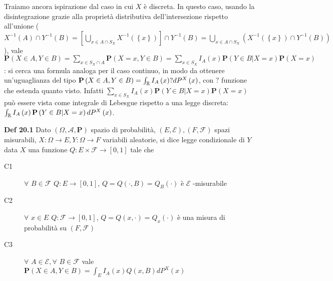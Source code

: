 \documentclass{article}
\begin{document}
Traiamo ancora ispirazione dal caso in cui $X$ \`{e} discreta. In questo
caso, usando la disintegrazione grazie alla propriet\`{a} distributiva
dell'intersezione rispetto all'unione ($X^{-1}\left( A\right) \cap
Y^{-1}\left( B\right) =\left[ \bigcup_{x\in A\cap S_{X}}X^{-1}\left( \left\{
x\right\} \right) \right] \cap Y^{-1}\left( B\right) =\bigcup_{x\in A\cap
S_{X}}\left( X^{-1}\left( \left\{ x\right\} \right) \cap Y^{-1}\left(
B\right) \right) $), vale $\mathbf{P}\left( X\in A,Y\in B\right) =\sum_{x\in
S_{X}\cap A}\mathbf{P}\left( X=x,Y\in B\right) =\sum_{x\in S_{X}}I_{A}\left(
x\right) \mathbf{P}\left( Y\in B|X=x\right) \mathbf{P}\left( X=x\right) $:
si cerca una formula analoga per il caso continuo, in modo da ottenere
un'uguaglianza del tipo $\mathbf{P}\left( X\in A,Y\in B\right) =\int_{%
\mathbb{R}
}I_{A}\left( x\right) ?dP^{X}\left( x\right) $, con $?$ funzione che estenda
quanto visto. Infatti $\sum_{x\in S_{X}}I_{A}\left( x\right) \mathbf{P}%
\left( Y\in B|X=x\right) \mathbf{P}\left( X=x\right) $ pu\`{o} essere vista
come integrale di Lebesgue rispetto a una legge discreta: $\int_{%
\mathbb{R}
}I_{A}\left( x\right) \mathbf{P}\left( Y\in B|X=x\right) dP^{X}\left(
x\right) $.

\textbf{Def 20.1} Dato $\left( \Omega ,\mathcal{A},\mathbf{P}\right) $
spazio di probabilit\`{a}, $\left( E,\mathcal{E}\right) ,\left( F,\mathcal{F}%
\right) $ spazi misurabili, $X:\Omega \rightarrow E,Y:\Omega \rightarrow F$
variabili aleatorie, si dice legge condizionale di $Y$ data $X$ una funzione 
$Q:E\times \mathcal{F}\rightarrow \left[ 0,1\right] $ tale che

\begin{description}
\item[C1] $\forall $ $B\in \mathcal{F}$ $Q:E\rightarrow \left[ 0,1\right] $, 
$Q=Q\left( \cdot ,B\right) =Q_{B}\left( \cdot \right) $ \`{e} $\mathcal{E}$%
-misurabile

\item[C2] $\forall $ $x\in E$ $Q:\mathcal{F}\rightarrow \left[ 0,1\right] $, 
$Q=Q\left( x,\cdot \right) =Q_{x}\left( \cdot \right) $ \`{e} una misura di
probabilit\`{a} su $\left( F,\mathcal{F}\right) $

\item[C3] $\forall $ $A\in \mathcal{E},\forall $ $B\in \mathcal{F}$ vale $%
\mathbf{P}\left( X\in A,Y\in B\right) =\int_{E}I_{A}\left( x\right) Q\left(
x,B\right) dP^{X}\left( x\right) $
\end{description}
\end{document}
